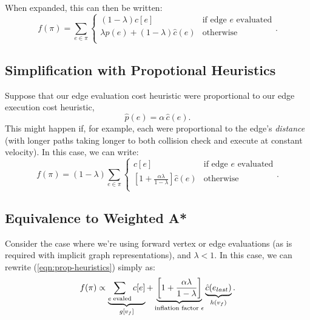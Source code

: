 When expanded,
this can then be written:
\begin{equation}
   f(\pi) = \sum_{e \in \pi} \left\{
   \begin{array}{cl}
      (1 - \lambda) c[e] & \mbox{if edge } e \mbox{ evaluated}  \\
      \lambda \hat{p}(e) + (1 - \lambda) \hat{c}(e) & \mbox{otherwise} \\
   \end{array}
   \right.
   .
   \label{eqn:general-objective-explicit}
\end{equation}

\subsection{Simplification with Propotional Heuristics}

Suppose that our edge evaluation cost heuristic
were proportional to our edge execution cost heuristic,
\begin{equation}
   \hat{p}(e) = \alpha \, \hat{c}(e) .
\end{equation}
This might happen if, for example, each were proportional to the edge's
\emph{distance} (with longer paths taking longer to both collision check
and execute at constant velocity).
In this case, we can write:
\begin{equation}
   f(\pi) = (1-\lambda) \sum_{e \in \pi} \left\{
   \begin{array}{cl}
      c[e] & \mbox{if edge } e \mbox{ evaluated}  \\
      \left[ 1 + \frac{\alpha\lambda}{1 - \lambda} \right] \hat{c}(e) & \mbox{otherwise} \\
   \end{array}
   \right.
   .
   \label{eqn:prop-heuristics}
\end{equation}

\subsection{Equivalence to Weighted A*}

Consider the case where we're using forward vertex or edge evaluations
(as is required with implicit graph representations),
and $\lambda < 1$.
In this case, we can rewrite (\ref{eqn:prop-heuristics})
simply as:
\begin{equation}
   f(\pi) \propto
   \underbrace{\sum_{e \; \mbox{\scriptsize evaled}} c[e]}_{g[v_f]}
   +
   \underbrace{\left[ 1 + \frac{\alpha \lambda}{1-\lambda} \right]}_{
      \mbox{\scriptsize inflation factor } \epsilon}
   \underbrace{\hat{c}(e_{last})}_{h(v_f)}
   .
\end{equation}

